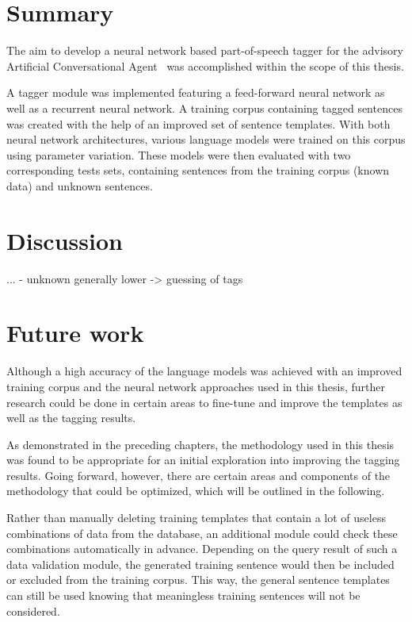\section{Summary}\label{c.conclusion.summary}
The aim to develop a neural network based part-of-speech tagger for the advisory Artificial Conversational Agent \Alex\ was accomplished within the scope of this thesis.

A tagger module was implemented featuring a feed-forward neural network as well as a recurrent neural network. A training corpus containing tagged sentences was created with the help of an improved set of sentence templates. With both neural network architectures, various language models were trained on this corpus using parameter variation. These models were then evaluated with two corresponding tests sets, containing sentences from the training corpus (known data) and unknown sentences.

\section{Discussion}\label{c.conclusion.discussion}
...
- unknown generally lower -> guessing of tags

\section{Future work}\label{c.conclusion.future}
Although a high accuracy of the language models was achieved with an improved training corpus and the neural network approaches used in this thesis, further research could be done in certain areas to fine-tune and improve the templates as well as the tagging results.

As demonstrated in the preceding chapters, the methodology used in this thesis was found to be appropriate for an initial exploration into improving the tagging results. Going forward, however, there are certain areas and components of the methodology that could be optimized, which will be outlined in the following.

Rather than manually deleting training templates that contain a lot of useless combinations of data from the database, an additional module could check these combinations automatically in advance. Depending on the query result of such a data validation module, the generated training sentence would then be included or excluded from the training corpus. This way, the general sentence templates can still be used knowing that meaningless training sentences will not be considered.

